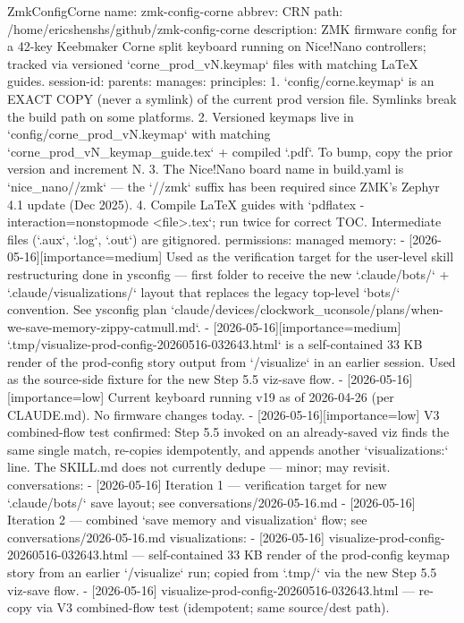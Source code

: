 \begin{cardlisting}{ZmkConfigCorne}
  name: zmk-config-corne
  abbrev: CRN
  path: /home/ericshenshs/github/zmk-config-corne
  description: ZMK firmware config for a 42-key Keebmaker Corne split keyboard running on Nice!Nano controllers; tracked via versioned `corne_prod_vN.keymap` files with matching LaTeX guides.
  session-id:
  parents:
  manages:
  principles:
    1. `config/corne.keymap` is an EXACT COPY (never a symlink) of the current prod version file. Symlinks break the build path on some platforms.
    2. Versioned keymaps live in `config/corne_prod_vN.keymap` with matching `corne_prod_vN_keymap_guide.tex` + compiled `.pdf`. To bump, copy the prior version and increment N.
    3. The Nice!Nano board name in build.yaml is `nice_nano//zmk` — the `//zmk` suffix has been required since ZMK's Zephyr 4.1 update (Dec 2025).
    4. Compile LaTeX guides with `pdflatex -interaction=nonstopmode <file>.tex`; run twice for correct TOC. Intermediate files (`.aux`, `.log`, `.out`) are gitignored.
  permissions: managed
  memory:
    - [2026-05-16][importance=medium] Used as the verification target for the user-level skill restructuring done in ysconfig — first folder to receive the new `.claude/bots/` + `.claude/visualizations/` layout that replaces the legacy top-level `bots/` convention. See ysconfig plan `claude/devices/clockwork_uconsole/plans/when-we-save-memory-zippy-catmull.md`.
    - [2026-05-16][importance=medium] `.tmp/visualize-prod-config-20260516-032643.html` is a self-contained 33 KB render of the prod-config story output from `/visualize` in an earlier session. Used as the source-side fixture for the new Step 5.5 viz-save flow.
    - [2026-05-16][importance=low] Current keyboard running v19 as of 2026-04-26 (per CLAUDE.md). No firmware changes today.
    - [2026-05-16][importance=low] V3 combined-flow test confirmed: Step 5.5 invoked on an already-saved viz finds the same single match, re-copies idempotently, and appends another `visualizations:` line. The SKILL.md does not currently dedupe — minor; may revisit.
  conversations:
    - [2026-05-16] Iteration 1 — verification target for new `.claude/bots/` save layout; see conversations/2026-05-16.md
    - [2026-05-16] Iteration 2 — combined `save memory and visualization` flow; see conversations/2026-05-16.md
  visualizations:
    - [2026-05-16] visualize-prod-config-20260516-032643.html — self-contained 33 KB render of the prod-config keymap story from an earlier `/visualize` run; copied from `.tmp/` via the new Step 5.5 viz-save flow.
    - [2026-05-16] visualize-prod-config-20260516-032643.html — re-copy via V3 combined-flow test (idempotent; same source/dest path).

\end{cardlisting}
